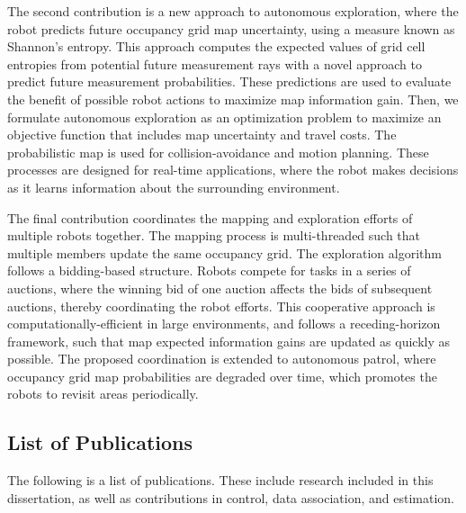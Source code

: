 \documentclass[thesis]{thesis-gwu}
\begin{document}
The second contribution is a new approach to autonomous exploration, where the robot predicts future occupancy grid map uncertainty, using a measure known as Shannon's entropy. This approach computes the expected values of grid cell entropies from potential future measurement rays with a novel approach to predict future measurement probabilities. These predictions are used to evaluate the benefit of possible robot actions to maximize map information gain. Then, we formulate autonomous exploration as an optimization problem to maximize an objective function that includes map uncertainty and travel costs. The probabilistic map is used for collision-avoidance and motion planning. These processes are designed for real-time applications, where the robot makes decisions as it learns information about the surrounding environment.

The final contribution coordinates the mapping and exploration efforts of multiple robots together. The mapping process is multi-threaded such that multiple members update the same occupancy grid. The exploration algorithm follows a bidding-based structure. Robots compete for tasks in a series of auctions, where the winning bid of one auction affects the bids of subsequent auctions, thereby coordinating the robot efforts. This cooperative approach is computationally-efficient in large environments, and follows a receding-horizon framework, such that map expected information gains are updated as quickly as possible. The proposed coordination is extended to autonomous patrol, where occupancy grid map probabilities are degraded over time, which promotes the robots to revisit areas periodically.

\subsection{List of Publications}

The following is a list of publications. These include research included in this dissertation, as well as contributions in control, data association, and estimation.

\end{document}
